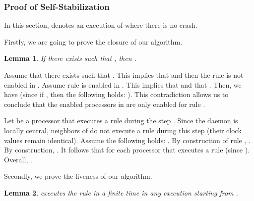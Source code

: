 \documentclass[11pt,english,letterpaper]{article}
\newtheorem{lemma}{Lemma}
\newenvironment{proof}{{\noindent\bf Proof. } }{{\hfill }}
\begin{document}
\subsubsection{Proof of Self-Stabilization}

In this section,  denotes an execution of  where there is no crash.

Firstly, we are going to prove the closure of our algorithm.

\begin{lemma}\label{lem:clotureChaine}
If there exists  such that , then .
\end{lemma}

\begin{proof}
Assume that there exists  such that . This implies that   and then the rule  is not enabled in . Assume rule  is enabled in . This implies that  and that . Then, we have  (since if , then the following holds: ). This contradiction allows us to conclude that the enabled processors in  are only enabled for rule .

Let  be a processor that executes a rule during the step . Since the daemon is locally central, neighbors of  do not execute a rule during this step (their clock values remain identical). Assume the following holds: . By construction of rule , . By construction, . It follows that  for each processor  that executes a rule (since ). Overall, .
\end{proof}

Secondly, we prove the liveness of our algorithm.

\begin{lemma}\label{lem:prelemVivaciteChaine}
  executes the rule  in a finite time in any execution starting from .
\end{lemma}
\end{document}
